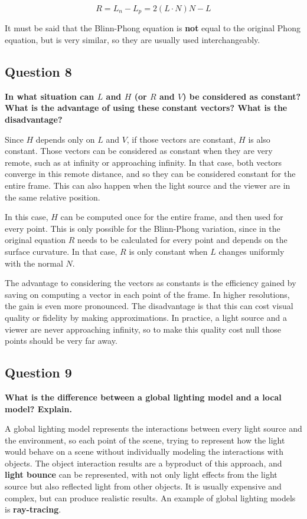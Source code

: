 \documentclass[12pt]{article}
\begin{document}
\[R = L_n - L_p = 2(L\cdot N)N - L\]

It must be said that the Blinn-Phong equation is \textbf{not} equal to the original Phong equation, but is very similar, so they are usually used interchangeably.

\subsection*{Question 8}
{\bfseries In what situation can $L$ and $H$ (or $R$ and $V$) be considered as constant? What is the advantage of using these constant vectors? What is the disadvantage?}

Since $H$ depends only on $L$ and $V$, if those vectors are constant, $H$ is also constant. Those vectors can be considered as constant when they are very remote, such as at infinity or approaching infinity. In that case, both vectors converge in this remote distance, and so they can be considered constant for the entire frame. This can also happen when the light source and the viewer are in the same relative position.

In this case, $H$ can be computed once for the entire frame, and then used for every point. This is only possible for the Blinn-Phong variation, since in the original equation $R$ needs to be calculated for every point and depends on the surface curvature. In that case, $R$ is only constant when $L$ changes uniformly with the normal $N$.

The advantage to considering the vectors as constants is the efficiency gained by saving on computing a vector in each point of the frame. In higher resolutions, the gain is even more pronounced. The disadvantage is that this can cost visual quality or fidelity by making approximations. In practice, a light source and a viewer are never approaching infinity, so to make this quality cost null those points should be very far away.

\subsection*{Question 9}
{\bfseries What is the difference between a global lighting model and a local model? Explain.}

A global lighting model represents the interactions between every light source and the environment, so each point of the scene, trying to represent how the light would behave on a scene without individually modeling the interactions with objects. The object interaction results are a byproduct of this approach, and \textbf{light bounce} can be represented, with not only light effects from the light source but also reflected light from other objects. It is usually expensive and complex, but can produce realistic results. An example of global lighting models is \textbf{ray-tracing}.
\end{document}
